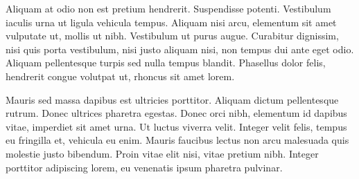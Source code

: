 \documentclass{ritsi/article}
\begin{document}
Aliquam at odio non est pretium hendrerit. Suspendisse potenti. Vestibulum iaculis urna ut ligula vehicula tempus. Aliquam nisi arcu, elementum sit amet vulputate ut, mollis ut nibh. Vestibulum ut purus augue. Curabitur dignissim, nisi quis porta vestibulum, nisi justo aliquam nisi, non tempus dui ante eget odio. Aliquam pellentesque turpis sed nulla tempus blandit. Phasellus dolor felis, hendrerit congue volutpat ut, rhoncus sit amet lorem.

Mauris sed massa dapibus est ultricies porttitor. Aliquam dictum pellentesque rutrum. Donec ultrices pharetra egestas. Donec orci nibh, elementum id dapibus vitae, imperdiet sit amet urna. Ut luctus viverra velit. Integer velit felis, tempus eu fringilla et, vehicula eu enim. Mauris faucibus lectus non arcu malesuada quis molestie justo bibendum. Proin vitae elit nisi, vitae pretium nibh. Integer porttitor adipiscing lorem, eu venenatis ipsum pharetra pulvinar.

\end{document}
